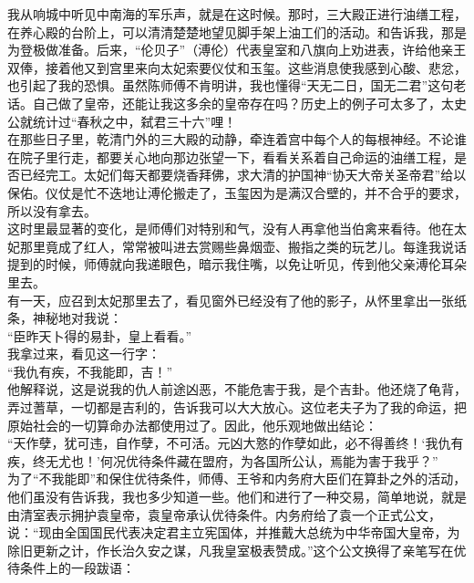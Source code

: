 我从响城中听见中南海的军乐声，就是在这时候。那时，三大殿正进行油缮工程，在养心殿的台阶上，可以清清楚楚地望见脚手架上油工们的活动。和告诉我，那是为登极做准备。后来，“伦贝子”（溥伦）代表皇室和八旗向上劝进表，许给他亲王双俸，接着他又到宫里来向太妃索要仪仗和玉玺。这些消息使我感到心酸、悲忿，也引起了我的恐惧。虽然陈师傅不肯明讲，我也懂得“天无二日，国无二君”这句老话。自己做了皇帝，还能让我这多余的皇帝存在吗？历史上的例子可太多了，太史公就统计过“春秋之中，弑君三十六”哩！\\

在那些日子里，乾清门外的三大殿的动静，牵连着宫中每个人的每根神经。不论谁在院子里行走，都要关心地向那边张望一下，看看关系着自己命运的油缮工程，是否已经完工。太妃们每天都要烧香拜佛，求大清的护国神“协天大帝关圣帝君”给以保佑。仪仗是忙不迭地让溥伦搬走了，玉玺因为是满汉合壁的，并不合乎的要求，所以没有拿去。\\

这时里最显著的变化，是师傅们对特别和气，没有人再拿他当伯禽来看待。他在太妃那里竟成了红人，常常被叫进去赏赐些鼻烟壶、搬指之类的玩艺儿。每逢我说话提到的时候，师傅就向我递眼色，暗示我住嘴，以免让听见，传到他父亲溥伦耳朵里去。\\

有一天，应召到太妃那里去了，看见窗外已经没有了他的影子，从怀里拿出一张纸条，神秘地对我说：\\

“臣昨天卜得的易卦，皇上看看。”\\

我拿过来，看见这一行字：\\

“我仇有疾，不我能即，吉！”\\

他解释说，这是说我的仇人前途凶恶，不能危害于我，是个吉卦。他还烧了龟背，弄过蓍草，一切都是吉利的，告诉我可以大大放心。这位老夫子为了我的命运，把原始社会的一切算命办法都使用过了。因此，他乐观地做出结论：\\

“天作孽，犹可违，自作孽，不可活。元凶大憝的作孽如此，必不得善终！‘我仇有疾，终无尤也！’何况优待条件藏在盟府，为各国所公认，焉能为害于我乎？”\\

为了“不我能即”和保住优待条件，师傅、王爷和内务府大臣们在算卦之外的活动，他们虽没有告诉我，我也多少知道一些。他们和进行了一种交易，简单地说，就是由清室表示拥护袁皇帝，袁皇帝承认优待条件。内务府给了袁一个正式公文，说：“现由全国国民代表决定君主立宪国体，并推戴大总统为中华帝国大皇帝，为除旧更新之计，作长治久安之谋，凡我皇室极表赞成。”这个公文换得了亲笔写在优待条件上的一段跋语：\\

